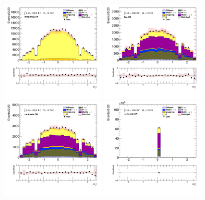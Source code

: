 		\begin{figure}[!htp]
			\begin{center}    
			\includegraphics[width=0.45\textwidth]{chapters/chapter6_HPlus/images/taulep/el_0_eta_DILEP_BTAG.png}
			\includegraphics[width=0.45\textwidth]{chapters/chapter6_HPlus/images/taulep/el_0_eta_ZEE.png} \\
			\includegraphics[width=0.45\textwidth]{chapters/chapter6_HPlus/images/taulep/el_0_eta_TAUEL_BVETO.png} 
			\includegraphics[width=0.45\textwidth]{chapters/chapter6_HPlus/images/taulep/el_0_eta_TAUMU_BVETO.png} \\

\end{center}
\end{figure}
